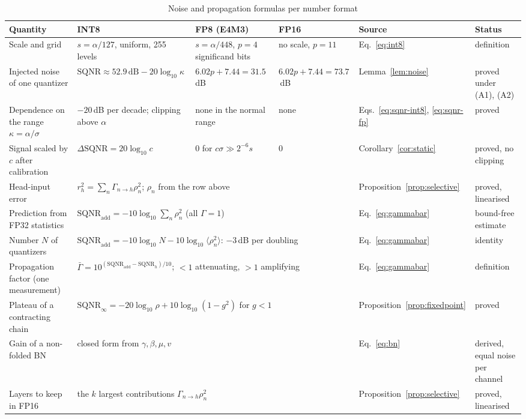 \begin{table}
\footnotesize\setlength{\tabcolsep}{4pt}
\caption{Noise and propagation formulas per number format}\label{tab:formulas}
\begin{tabular}{@{}p{3.3cm}p{3.6cm}p{3.1cm}p{2.0cm}p{2.7cm}p{2.6cm}@{}}
\toprule
Quantity & INT8 & FP8 (E4M3) & FP16 & Source & Status \\
\midrule
Scale and grid & $s=\alpha/127$, uniform, 255 levels & $s=\alpha/448$, $p=4$ significand bits & no scale, $p=11$ & Eq.~\eqref{eq:int8} & definition \\
Injected noise of one quantizer & $\mathrm{SQNR}\approx52.9\,\mathrm{dB}-20\log_{10}\kappa$ & $6.02p+7.44=31.5$\,dB & $6.02p+7.44=73.7$\,dB & Lemma~\ref{lem:noise} & proved under (A1), (A2) \\
Dependence on the range $\kappa=\alpha/\sigma$ & $-20$\,dB per decade; clipping above $\alpha$ & none in the normal range & none & Eqs.~\eqref{eq:sqnr-int8}, \eqref{eq:sqnr-fp} & proved \\
Signal scaled by $c$ after calibration & $\Delta\mathrm{SQNR}=20\log_{10}c$ & $0$ for $c\sigma\gg2^{-6}s$ & $0$ & Corollary~\ref{cor:static} & proved, no clipping \\
Head-input error & \multicolumn{3}{p{9.1cm}}{$r_h^2=\sum_n\Gamma_{n\to h}\rho_n^2$; $\rho_n$ from the row above} & Proposition~\ref{prop:selective} & proved, linearised \\
Prediction from FP32 statistics & \multicolumn{3}{p{9.1cm}}{$\mathrm{SQNR}_\text{add}=-10\log_{10}\sum_n\rho_n^2$ (all $\Gamma=1$)} & Eq.~\eqref{eq:gammabar} & bound-free estimate \\
Number $N$ of quantizers & \multicolumn{3}{p{9.1cm}}{$\mathrm{SQNR}_\text{add}=-10\log_{10}N-10\log_{10}\langle\rho_n^2\rangle$: $-3$\,dB per doubling} & Eq.~\eqref{eq:gammabar} & identity \\
Propagation factor (one measurement) & \multicolumn{3}{p{9.1cm}}{$\bar\Gamma=10^{(\mathrm{SQNR}_\text{add}-\mathrm{SQNR}_h)/10}$; $<1$ attenuating, $>1$ amplifying} & Eq.~\eqref{eq:gammabar} & definition \\
Plateau of a contracting chain & \multicolumn{3}{p{9.1cm}}{$\mathrm{SQNR}_\infty=-20\log_{10}\rho+10\log_{10}(1-g^2)$ for $g<1$} & Proposition~\ref{prop:fixedpoint} & proved \\
Gain of a non-folded BN & \multicolumn{3}{p{9.1cm}}{closed form from $\gamma,\beta,\mu,v$} & Eq.~\eqref{eq:bn} & derived, equal noise per channel \\
Layers to keep in FP16 & \multicolumn{3}{p{9.1cm}}{the $k$ largest contributions $\Gamma_{n\to h}\rho_n^2$} & Proposition~\ref{prop:selective} & proved, linearised \\

\end{tabular}
\end{table}
